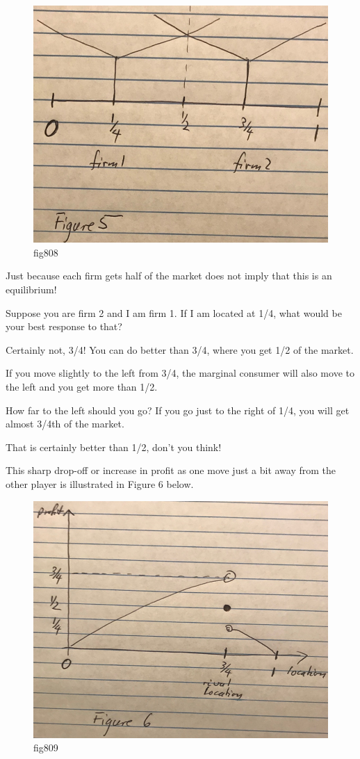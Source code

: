 \documentclass[
]{book}
\begin{document}
\begin{figure}

{\centering \includegraphics[width=0.5\linewidth]{img/ch8/fig8} 

}

\caption{fig808}\label{fig:fig808}
\end{figure}

Just because each firm gets half of the market does not imply that this is an equilibrium!

Suppose you are firm 2 and I am firm 1. If I am located at 1/4, what would be your best response to that?

Certainly not, 3/4! You can do better than 3/4, where you get 1/2 of the market.

If you move slightly to the left from 3/4, the marginal consumer will also move to the left and you get more than 1/2.

How far to the left should you go? If you go just to the right of 1/4, you will get almost 3/4th of the market.

That is certainly better than 1/2, don't you think!

This sharp drop-off or increase in profit as one move just a bit away from the other player is illustrated in Figure 6 below.

\begin{figure}

{\centering \includegraphics[width=0.5\linewidth]{img/ch8/fig9} 

}

\caption{fig809}\label{fig:fig809}
\end{figure}
\end{document}
